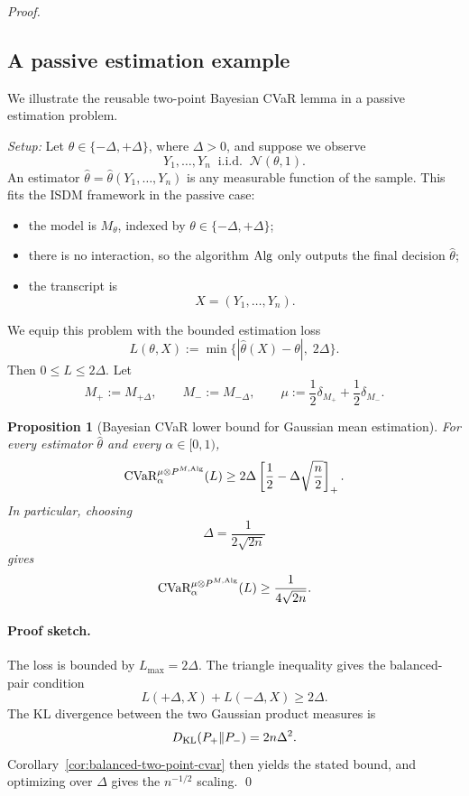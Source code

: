 \documentclass[conference]{IEEEtran}
\newtheorem{proposition}{Proposition}
\begin{document}
\begin{proof}[Proof]
\subsection{A passive estimation example}

We illustrate the reusable two-point Bayesian \textup{CVaR} lemma in a passive estimation problem.

\textit{Setup:}
Let \(\theta\in\{-\Delta,+\Delta\}\), where \(\Delta>0\), and suppose we observe
\[
Y_1,\dots,Y_n \;\;\text{i.i.d.}\;\; \mathcal{N}(\theta,1).
\]
An estimator \(\widehat{\theta}=\widehat{\theta}(Y_1,\dots,Y_n)\) is any measurable function of the sample. This fits the ISDM framework in the passive case:
\begin{itemize}
\item the model is \(M_\theta\), indexed by \(\theta\in\{-\Delta,+\Delta\}\);
\item there is no interaction, so the algorithm \(\textup{Alg}\) only outputs the final decision \(\widehat{\theta}\);
\item the transcript is
\[
X=(Y_1,\dots,Y_n).
\]
\end{itemize}

We equip this problem with the bounded estimation loss
\[
L(\theta,X):=\min\{|\widehat{\theta}(X)-\theta|,\;2\Delta\}.
\]
Then \(0\le L\le 2\Delta\). Let
\[
M_+ := M_{+\Delta},\qquad M_-:=M_{-\Delta},
\qquad
\mu:=\frac12\delta_{M_+}+\frac12\delta_{M_-}.
\]

\begin{proposition}[Bayesian \textup{CVaR} lower bound for Gaussian mean estimation]
\label{prop:gaussian-mean-cvar}
For every estimator \(\widehat{\theta}\) and every \(\alpha\in[0,1)\),
\[
\textup{CVaR}_\alpha^{\mu\otimes P^{M,\textup{Alg}}}(L)
\ge
2\Delta\left[\frac12-\Delta\sqrt{\frac{n}{2}}\right]_+.
\]
In particular, choosing
\[
\Delta=\frac{1}{2\sqrt{2n}}
\]
gives
\[
\textup{CVaR}_\alpha^{\mu\otimes P^{M,\textup{Alg}}}(L)
\ge
\frac{1}{4\sqrt{2n}}.
\]
\end{proposition}

\paragraph{Proof sketch.}
The loss is bounded by \(L_{\max}=2\Delta\). The triangle inequality gives the balanced-pair condition
\[
L(+\Delta,X)+L(-\Delta,X)\ge 2\Delta.
\]
The KL divergence between the two Gaussian product measures is
\[
D_{\textup{KL}}(P_+\|P_-)=2n\Delta^2.
\]
Corollary~\ref{cor:balanced-two-point-cvar} then yields the stated bound, and optimizing over \(\Delta\) gives the \(n^{-1/2}\) scaling. \qed


\end{proof}
\end{document}
